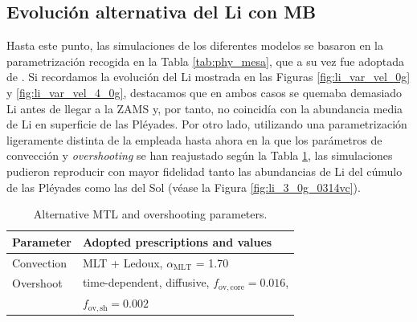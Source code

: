 \subsection{Evolución alternativa del Li con MB} \label{sec:alt_mlt}
Hasta este punto, las simulaciones de los diferentes modelos se basaron en la parametrización recogida en la Tabla \ref{tab:phy_mesa}, que a su vez fue adoptada de \cite{Choi2016}. Si recordamos la evolución del Li mostrada en las Figuras \ref{fig:li_var_vel_0g} y \ref{fig:li_var_vel_4_0g}, destacamos que en ambos casos se quemaba demasiado Li antes de llegar a la ZAMS y, por tanto, no coincidía con la abundancia media de Li en superficie de las Pléyades. Por otro lado, utilizando una parametrización ligeramente distinta de la empleada hasta ahora en la que los parámetros de convección y \textit{overshooting} se han reajustado según la Tabla \ref{tab:phy_alt_mesa}, las simulaciones pudieron reproducir con mayor fidelidad tanto las abundancias de Li del cúmulo de las Pléyades como las del Sol (véase la Figura \ref{fig:li_3_0g_0314vc}).\par

\begin{table}
	\centering
	\caption{Alternative MTL and overshooting parameters.}
	\label{tab:phy_alt_mesa}
	\begin{tabular}{ll} 
		\hline
		Parameter & Adopted prescriptions and values\\
		\hline
		Convection & MLT + Ledoux, $\alpha_\mathrm{MLT}$ = 1.70\\
		Overshoot & time-dependent, diffusive, $f_\mathrm{ov,core}=0.016$, \\ & $f_\mathrm{ov,sh}=0.002$\\
		\hline
	\end{tabular}
\end{table}


